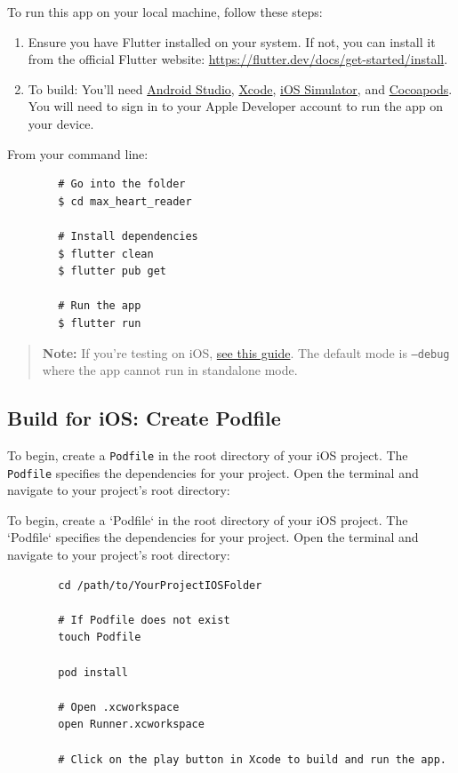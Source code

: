 \documentclass[a4paper]{scrreprt}
\begin{document}
To run this app on your local machine, follow these steps:
\begin{enumerate}
    \item Ensure you have Flutter installed on your system. If not, you can install it from
    the official Flutter website: \url{https://flutter.dev/docs/get-started/install}.
    
    \item To build: You'll need \href{https://developer.android.com/studio/}{Android Studio},
    \href{https://developer.apple.com/xcode/}{Xcode}, \href{https://docs.expo.io/workflow/ios-simulator/}{iOS Simulator}, and \href{https://cocoapods.org/}{Cocoapods}. You will need to sign in to your Apple Developer account to run the app on your device.
\end{enumerate}

    From your command line:
    \begin{verbatim}
        # Go into the folder
        $ cd max_heart_reader
        
        # Install dependencies
        $ flutter clean
        $ flutter pub get
        
        # Run the app
        $ flutter run
    \end{verbatim}

    \begin{quote}
        \textbf{Note:} If you're testing on iOS, \href{https://docs.flutter.dev/testing/build-modes}{see this guide}. The default mode is \texttt{--debug} where the app cannot run in standalone mode.
    \end{quote}
    
    \subsection*{Build for iOS: Create Podfile}
    
    To begin, create a \texttt{Podfile} in the root directory of your iOS project. The \texttt{Podfile} specifies the dependencies for your project. Open the terminal and navigate to your project's root directory:
    
    
To begin, create a `Podfile` in the root directory of your iOS project. The `Podfile` specifies the dependencies for your project.
Open the terminal and navigate to your project's root directory:
    \begin{verbatim}
        cd /path/to/YourProjectIOSFolder

        # If Podfile does not exist
        touch Podfile

        pod install

        # Open .xcworkspace
        open Runner.xcworkspace
        
        # Click on the play button in Xcode to build and run the app.
    \end{verbatim}
\end{document}
